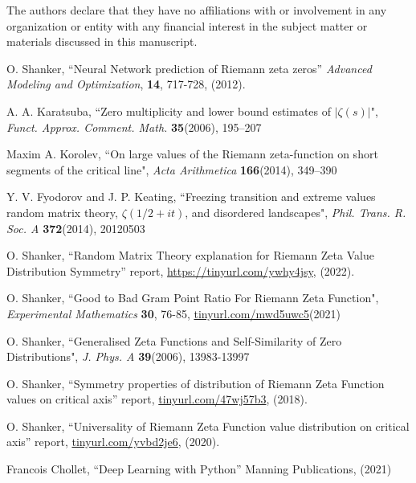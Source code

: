 \documentclass[twoside]{article}
\begin{document}
The authors declare that they have no affiliations with or involvement in any organization 
or entity with any financial interest in the subject matter or materials discussed 
in this manuscript.



\begin{thebibliography}{10}

 O. Shanker, ``Neural Network prediction of Riemann zeta zeros''
{\it Advanced Modeling and Optimization}, {\bf 14}, 717-728, (2012). 

 A. A. Karatsuba, 
``Zero multiplicity and lower bound estimates of $|\zeta(s)|$",
{\it Funct.  Approx. Comment. Math.} {\bf35}(2006), 195–207

 Maxim A. Korolev, 
``On large values of the Riemann zeta-function on short segments of the critical line",
{\it Acta Arithmetica} {\bf166}(2014), 349–390

 Y. V. Fyodorov and J. P. Keating,
``Freezing transition and extreme values random matrix theory, $\zeta(1/2 + it)$, and disordered landscapes",
{\it Phil. Trans. R. Soc. A} {\bf372}(2014),  20120503

 O. Shanker, 
``Random Matrix Theory explanation for Riemann Zeta Value Distribution Symmetry''
 report,
\url{https://tinyurl.com/ywhy4jsy}, 
(2022). 

 O. Shanker, 
``Good to Bad Gram Point Ratio For Riemann Zeta Function",
{\it Experimental Mathematics} {\bf 30}, 76-85,
\url{tinyurl.com/mwd5uwc5}(2021)

 O. Shanker, 
``Generalised Zeta Functions and Self-Similarity of Zero Distributions",
{\it J.  Phys. A} {\bf39}(2006), 13983-13997

 O. Shanker, 
``Symmetry properties of distribution of Riemann Zeta Function values on critical axis''
 report,
\url{tinyurl.com/47wj57b3}, 
(2018). 

 O. Shanker, 
``Universality of Riemann Zeta Function value distribution on critical axis''
 report,
\url{tinyurl.com/yvbd2je6}, 
(2020). 

 Francois Chollet, ``Deep Learning with Python''
Manning Publications,  (2021)




\end{thebibliography} 
\end{document}
